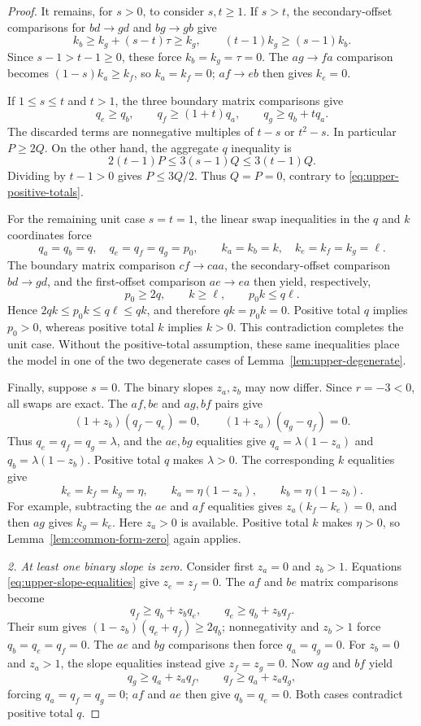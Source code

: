 \documentclass[11pt,a4paper]{article}
\begin{document}
\begin{proof}
It remains, for $s>0$, to consider $s,t\ge1$. If $s>t$, the
secondary-offset comparisons for $bd\to gd$ and $bg\to gb$ give
\[
k_b\ge k_g+(s-t)\tau\ge k_g,
\qquad (t-1)k_g\ge(s-1)k_b.
\]
Since $s-1>t-1\ge0$, these force $k_b=k_g=\tau=0$.
The $ag\to fa$ comparison becomes
$(1-s)k_a\ge k_f$, so $k_a=k_f=0$; $af\to eb$ then gives $k_e=0$.

If $1\le s\le t$ and $t>1$, the three boundary matrix comparisons give
\[
q_e\ge q_b,\qquad q_f\ge(1+t)q_a,\qquad
q_g\ge q_b+tq_a.
\]
The discarded terms are nonnegative multiples of $t-s$ or $t^2-s$.
In particular $P\ge2Q$. On the other hand, the aggregate $q$ inequality
is
\[
2(t-1)P\le3(s-1)Q\le3(t-1)Q.
\]
Dividing by $t-1>0$ gives $P\le3Q/2$. Thus $Q=P=0$, contrary to
\eqref{eq:upper-positive-totals}.

For the remaining unit case $s=t=1$, the linear swap inequalities in
the $q$ and $k$ coordinates force
\[
q_a=q_b=q,\quad q_e=q_f=q_g=p_0,\qquad
k_a=k_b=k,\quad k_e=k_f=k_g=\ell.
\]
The boundary matrix comparison $cf\to caa$, the secondary-offset
comparison $bd\to gd$, and the first-offset comparison $ae\to ea$
then yield, respectively,
\[
p_0\ge2q,\qquad k\ge\ell,\qquad p_0k\le q\ell.
\]
Hence $2qk\le p_0k\le q\ell\le qk$, and therefore $qk=p_0k=0$.
Positive total $q$ implies $p_0>0$, whereas positive total $k$ implies
$k>0$. This contradiction completes the unit case. Without the
positive-total assumption, these same inequalities place the model
in one of the two degenerate cases of
Lemma~\ref{lem:upper-degenerate}.

Finally, suppose $s=0$. The binary slopes $z_a,z_b$ may now differ.
Since $r=-3<0$, all swaps are exact. The $af,be$ and $ag,bf$ pairs
give
\[
(1+z_b)(q_f-q_e)=0,\qquad
(1+z_a)(q_g-q_f)=0.
\]
Thus $q_e=q_f=q_g=\lambda$, and the $ae,bg$ equalities give
$q_a=\lambda(1-z_a)$ and $q_b=\lambda(1-z_b)$.
Positive total $q$ makes $\lambda>0$.
The corresponding $k$ equalities give
\[
k_e=k_f=k_g=\eta,\qquad
k_a=\eta(1-z_a),\qquad k_b=\eta(1-z_b).
\]
For example, subtracting the $ae$ and $af$ equalities gives
$z_a(k_f-k_e)=0$, and then $ag$ gives $k_g=k_e$.
Here $z_a>0$ is available. Positive total $k$ makes $\eta>0$,
so Lemma~\ref{lem:common-form-zero} again applies.

\smallskip\noindent
\emph{2. At least one binary slope is zero.}
Consider first $z_a=0$ and $z_b>1$. Equations
\eqref{eq:upper-slope-equalities} give $z_e=z_f=0$.
The $af$ and $be$ matrix comparisons become
\[
q_f\ge q_b+z_bq_e,
\qquad q_e\ge q_b+z_bq_f.
\]
Their sum gives $(1-z_b)(q_e+q_f)\ge2q_b$; nonnegativity and
$z_b>1$ force $q_b=q_e=q_f=0$. The $ae$ and $bg$ comparisons then
force $q_a=q_g=0$.
For $z_b=0$ and $z_a>1$, the slope equalities instead give
$z_f=z_g=0$. Now $ag$ and $bf$ yield
\[
q_g\ge q_a+z_aq_f,
\qquad q_f\ge q_a+z_aq_g,
\]
forcing $q_a=q_f=q_g=0$; $af$ and $ae$ then give $q_b=q_e=0$.
Both cases contradict positive total $q$.


\end{proof}
\end{document}
